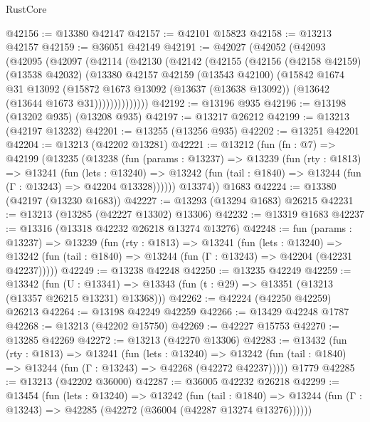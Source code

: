 \begin{lexlean}{RustCore}
\begin{coremodule}
@42156 := @13380 @42147
@42157 := @42101 @15823
@42158 := @13213 @42157
@42159 := @36051 @42149
@42191 := @42027
    (@42052
      (@42093
        (@42095
          (@42097
            (@42114
              (@42130
                (@42142
                  (@42155
                    (@42156
                      (@42158 @42159)
                      (@13538 @42032)
                      (@13380
                        @42157
                        @42159
                        (@13543 @42100)
                        (@15842
                          @1674
                          @31
                          @13092
                          (@15872
                            @1673
                            @13092
                            (@13637 (@13638 @13092))
                            (@13642 (@13644 @1673 @31))))))))))))))
@42192 := @13196 @935
@42196 := @13198 (@13202 @935) (@13208 @935)
@42197 := @13217 @26212
@42199 := @13213 (@42197 @13232)
@42201 := @13255 (@13256 @935)
@42202 := @13251 @42201
@42204 := @13213 (@42202 @13281)
@42221 := @13212
    (fun (fn : @7) =>
    @42199
      (@13235
        (@13238
          (fun (params : @13237) =>
          @13239
            (fun (rty : @1813) =>
            @13241
              (fun (lets : @13240) =>
              @13242 (fun (tail : @1840) => @13244 (fun (Γ : @13243) => @42204 @13328))))))
        @13374))
    @1683
@42224 := @13380 (@42197 (@13230 @1683))
@42227 := @13293 (@13294 @1683) @26215
@42231 := @13213 (@13285 (@42227 @13302) @13306)
@42232 := @13319 @1683
@42237 := @13316 (@13318 @42232 @26218 @13274 @13276)
@42248 := fun (params : @13237) =>
  @13239
    (fun (rty : @1813) =>
    @13241
      (fun (lets : @13240) =>
      @13242 (fun (tail : @1840) => @13244 (fun (Γ : @13243) => @42204 (@42231 @42237)))))
@42249 := @13238 @42248
@42250 := @13235 @42249
@42259 := @13342
    (fun (U : @13341) => @13343 (fun (t : @29) => @13351 (@13213 (@13357 @26215 @13231) @13368)))
@42262 := @42224 (@42250 @42259) @26213
@42264 := @13198 @42249 @42259
@42266 := @13429 @42248 @1787
@42268 := @13213 (@42202 @15750)
@42269 := @42227 @15753
@42270 := @13285 @42269
@42272 := @13213 (@42270 @13306)
@42283 := @13432
    (fun (rty : @1813) =>
    @13241
      (fun (lets : @13240) =>
      @13242 (fun (tail : @1840) => @13244 (fun (Γ : @13243) => @42268 (@42272 @42237)))))
    @1779
@42285 := @13213 (@42202 @36000)
@42287 := @36005 @42232 @26218
@42299 := @13454
    (fun (lets : @13240) =>
    @13242
      (fun (tail : @1840) =>
      @13244 (fun (Γ : @13243) => @42285 (@42272 (@36004 (@42287 @13274 @13276))))))

\end{coremodule}
\end{lexlean}
